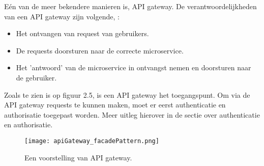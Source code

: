 Eén van de meer bekendere manieren is, API gateway. De verantwoordelijkheden van een API gateway zijn volgende, \textcite{Siraj2017}:
\begin{itemize}
	\item Het ontvangen van request van gebruikers.
	\item De requests doorsturen naar de correcte microservice.
	\item Het 'antwoord' van de microservice in ontvangst nemen en doorsturen naar de gebruiker.
\end{itemize}
Zoals te zien is op figuur 2.5, is een API gateway het toegangspunt. Om via de API gateway requests te kunnen maken, moet er eerst authenticatie en authorisatie toegepast worden. Meer uitleg hierover in de sectie over authenticatie en authorisatie.
\begin{figure}[h]
	\texttt{[image: apiGateway\_facadePattern.png]}
	\centering
	\caption{Een voorstelling van API gateway. \textcite{Siraj2017}}
\end{figure}


